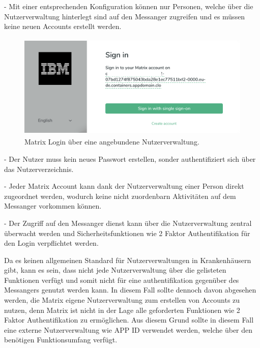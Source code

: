 - Mit einer entsprechenden Konfiguration können nur Personen, welche über die Nutzerverwaltung hinterlegt sind auf den Messanger zugreifen und es müssen keine neuen Accounts erstellt werden. 

\begin{figure}[htb]
    \centering
    \includegraphics[height=5cm]{graphics/sso.png}
    \caption[Matrix Login über eine angebundene Nutzerverwaltung]{Matrix Login über eine angebundene Nutzerverwaltung.\footnotemark}
    \label{abb:DHBWLogo}
\end{figure}

- Der Nutzer muss kein neues Passwort erstellen, sonder authentifiziert sich über das Nutzerverzeichnis.

- Jeder Matrix Account kann dank der Nutzerverwaltung einer Person direkt zugeordnet werden, wodurch keine nicht zuordenbarn Aktivitäten auf dem Messanger vorkommen können.  

- Der Zugriff auf den Messanger dienst kann über die Nutzerverwaltung zentral überwacht werden und Sicherheitsfunktionen wie 2 Faktor Authentifikation für den Login verpflichtet werden. 

Da es keinen allgemeinen Standard für Nutzerverwaltungen in Krankenhäusern gibt, kann es sein, dass nicht jede Nutzerverwaltung über die gelisteten Funktionen verfügt und somit nicht für eine authentifikation gegenüber des Messangers genutzt werden kann. In diesem Fall sollte dennoch davon abgesehen werden, die Matrix eigene Nutzerverwaltung zum erstellen von Accounts zu nutzen, denn Matrix ist nicht in der Lage alle geforderten Funktionen wie 2 Faktor Authentifikation zu ermöglichen. Aus diesem Grund sollte in diesem Fall eine externe Nutzerverwaltung wie APP ID verwendet werden, welche über den benötigen Funktionsumfang verfügt.


